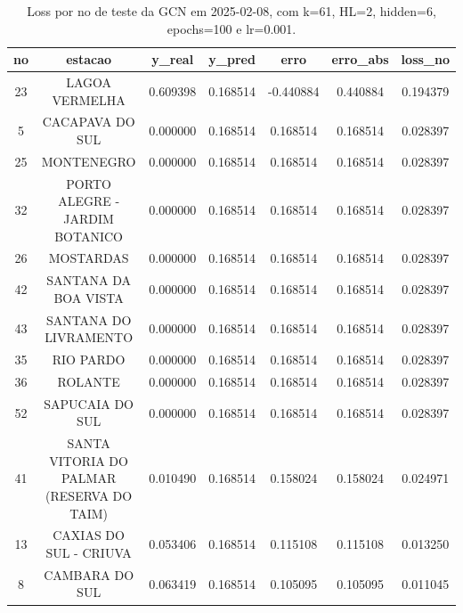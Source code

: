 \begin{table}[h]
\centering
\caption{Loss por no de teste da GCN em 2025-02-08, com k=61, HL=2, hidden=6, epochs=100 e lr=0.001.}
\label{tab:gcn_loss_k61_hl2_h6_e100_d20250208}
\begin{tabular}{ccccccc}
\toprule
no & estacao & y\_real & y\_pred & erro & erro\_abs & loss\_no \\
\midrule
23 & LAGOA VERMELHA & 0.609398 & 0.168514 & -0.440884 & 0.440884 & 0.194379 \\
5 & CACAPAVA DO SUL & 0.000000 & 0.168514 & 0.168514 & 0.168514 & 0.028397 \\
25 & MONTENEGRO & 0.000000 & 0.168514 & 0.168514 & 0.168514 & 0.028397 \\
32 & PORTO ALEGRE - JARDIM BOTANICO & 0.000000 & 0.168514 & 0.168514 & 0.168514 & 0.028397 \\
26 & MOSTARDAS & 0.000000 & 0.168514 & 0.168514 & 0.168514 & 0.028397 \\
42 & SANTANA DA BOA VISTA & 0.000000 & 0.168514 & 0.168514 & 0.168514 & 0.028397 \\
43 & SANTANA DO LIVRAMENTO & 0.000000 & 0.168514 & 0.168514 & 0.168514 & 0.028397 \\
35 & RIO PARDO & 0.000000 & 0.168514 & 0.168514 & 0.168514 & 0.028397 \\
36 & ROLANTE & 0.000000 & 0.168514 & 0.168514 & 0.168514 & 0.028397 \\
52 & SAPUCAIA DO SUL & 0.000000 & 0.168514 & 0.168514 & 0.168514 & 0.028397 \\
41 & SANTA VITORIA DO PALMAR (RESERVA DO TAIM) & 0.010490 & 0.168514 & 0.158024 & 0.158024 & 0.024971 \\
13 & CAXIAS DO SUL - CRIUVA & 0.053406 & 0.168514 & 0.115108 & 0.115108 & 0.013250 \\
8 & CAMBARA DO SUL & 0.063419 & 0.168514 & 0.105095 & 0.105095 & 0.011045 \\
\bottomrule
\end{tabular}
\end{table}
